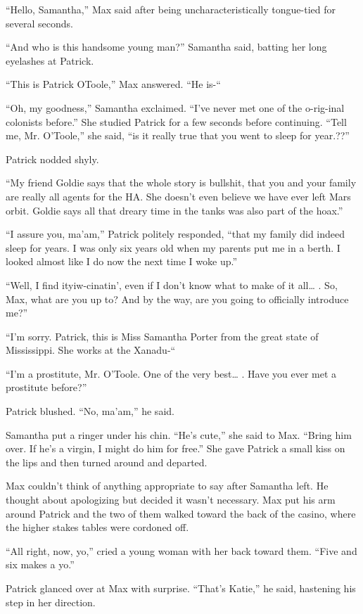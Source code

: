 \documentclass[]{article}
\begin{document}
{“Hello, Samantha,” Max said after being uncharacteristically tongue-tied for several seconds.

“And who is this handsome young man?” Samantha said, batting her long eyelashes at Patrick.

“This is Patrick OToole,” Max answered. “He is-“

“Oh, my goodness,” Samantha exclaimed. “I’ve never met one of the o-rig-inal colonists before.” She studied Patrick for a few seconds before continuing. “Tell me, Mr. O’Toole,” she said, “is it really true that you went to sleep for year.??”

Patrick nodded shyly.

“My friend Goldie says that the whole story is bullshit, that you and your family are really all agents for the HA. She doesn’t even believe we have ever left Mars orbit. Goldie says all that dreary time in the tanks was also part of the hoax.”

“I assure you, ma’am,” Patrick politely responded, “that my family did indeed sleep for years. I was only six years old when my parents put me in a berth. I looked almost like I do now the next time I woke up.”

“Well, I find ityiw-cinatin’, even if I don’t know what to make of it all… . So, Max, what are you up to? And by the way, are you going to officially introduce me?”

“I’m sorry. Patrick, this is Miss Samantha Porter from the great state of Mississippi. She works at the Xanadu-“

“I’m a prostitute, Mr. O’Toole. One of the very best… . Have you ever met a prostitute before?”

Patrick blushed. “No, ma’am,” he said.

Samantha put a ringer under his chin. “He’s cute,” she said to Max. “Bring him over. If he’s a virgin, I might do him for free.” She gave Patrick a small kiss on the lips and then turned around and departed.

Max couldn’t think of anything appropriate to say after Samantha left. He thought about apologizing but decided it wasn’t necessary. Max put his arm around Patrick and the two of them walked toward the back of the casino, where the higher stakes tables were cordoned off.

“All right, now, yo,” cried a young woman with her back toward them. “Five and six makes a yo.”

Patrick glanced over at Max with surprise. “That’s Katie,” he said, hastening his step in her direction.

}
\end{document}
